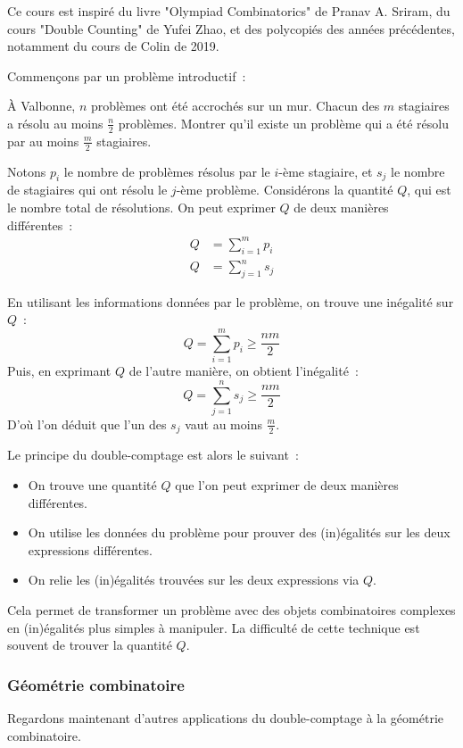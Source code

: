 Ce cours est inspiré du livre "Olympiad Combinatorics" de Pranav A. Sriram, du cours "Double Counting" de Yufei Zhao, et des polycopiés des années précédentes, notamment du cours de Colin de 2019.

Commençons par un problème introductif~:
\begin{exo}
	À Valbonne, $n$ problèmes ont été accrochés sur un mur. Chacun des $m$ stagiaires a résolu au moins $\frac{n}2$ problèmes. Montrer qu'il existe un problème qui a été résolu par au moins $\frac{m}2$ stagiaires.
\end{exo}
\begin{sol}
	Notons $p_i$ le nombre de problèmes résolus par le $i$-ème stagiaire, et $s_j$ le nombre de stagiaires qui ont résolu le $j$-ème problème.
	Considérons la quantité $Q$, qui est le nombre total de résolutions.  
	On peut exprimer $Q$ de deux manières différentes~:
	\begin{align*}
		Q &= \sum_{i = 1}^m p_i \\
		Q &= \sum_{j = 1}^n s_j
	\end{align*}
	
	En utilisant les informations données par le problème, on trouve une inégalité sur $Q$~:
	$$Q = \sum_{i = 1}^m p_i \geq \frac{nm}2$$
	Puis, en exprimant $Q$ de l'autre manière, on obtient l'inégalité~:
	$$Q = \sum_{j = 1}^n s_j \geq \frac{nm}2$$
	D'où l'on déduit que l'un des $s_j$ vaut au moins $\frac{m}2$.
\end{sol}

Le principe du double-comptage est alors le suivant~:
\begin{itemize}
\item On trouve une quantité $Q$ que l'on peut exprimer de deux manières différentes.
\item On utilise les données du problème pour prouver des (in)égalités sur les deux expressions différentes.
\item On relie les (in)égalités trouvées sur les deux expressions via $Q$.
\end{itemize}
Cela permet de transformer un problème avec des objets combinatoires complexes en (in)égalités plus simples à manipuler. La difficulté de cette technique est souvent de trouver la quantité $Q$.

\subsubsection{Géométrie combinatoire}
Regardons maintenant d'autres applications du double-comptage à la géométrie combinatoire.

